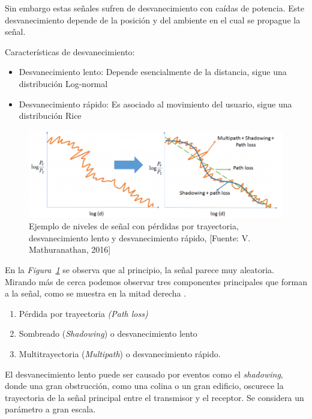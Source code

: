 Sin embargo estas señales sufren de desvanecimiento con caídas de potencia. Este desvanecimiento depende de la posición y del ambiente en el cual se propague la señal.\newline

Características de desvanecimiento:
\begin{itemize}
    \item Desvanecimiento lento:
    Depende esencialmente de la distancia, sigue una distribución Log-normal
    \item Desvanecimiento rápido:
    Es asociado al movimiento del usuario, sigue una distribución Rice
\end{itemize}

\begin{figure}[th]
\centering
\includegraphics[scale=.8]{Figures/Ejemplo de niveles de señal con desvanecimiento lento y desvanecimiento rápido}
\decoRule
\caption[Ejemplo de niveles de señal con pérdidas por trayectoria, desvanecimiento lento y desvanecimiento rápido]{Ejemplo de niveles de señal con pérdidas por trayectoria, desvanecimiento lento y desvanecimiento rápido, [Fuente: V. Mathuranathan, 2016]}
\label{fig:Desvanecimientos}
\end{figure}

En la \textit{Figura~\ref{fig:Desvanecimientos}} se observa que al principio, la señal parece muy aleatoria. Mirando más de cerca podemos observar tres componentes principales que forman a la señal, como se muestra en la mitad derecha \parencite{Mathuranathan2016}.
\begin{enumerate}
    \item  Pérdida por trayectoria \textit{(Path loss)}
    \item  Sombreado (\textit{Shadowing}) o desvanecimiento lento
    \item  Multitrayectoria (\textit{Multipath}) o desvanecimiento rápido.
\end{enumerate}

El desvanecimiento lento puede ser causado por eventos como el \textit{shadowing}, donde una gran obstrucción, como una colina o un gran edificio, oscurece la trayectoria de la señal principal entre el transmisor y el receptor. Se considera un parámetro a gran escala.\newline

